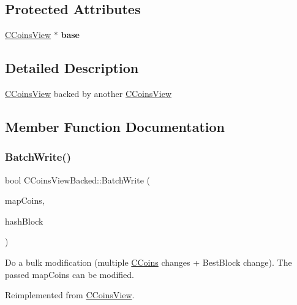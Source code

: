 \subsection*{Protected Attributes}
\begin{DoxyCompactItemize}
\item 
\mbox{\label{class_c_coins_view_backed_a901472317114adc4c104efd61dcf6203}} 
\mbox{\hyperlink{class_c_coins_view}{C\+Coins\+View}} $\ast$ {\bfseries base}
\end{DoxyCompactItemize}


\subsection{Detailed Description}
\mbox{\hyperlink{class_c_coins_view}{C\+Coins\+View}} backed by another \mbox{\hyperlink{class_c_coins_view}{C\+Coins\+View}} 

\subsection{Member Function Documentation}
\mbox{\label{class_c_coins_view_backed_ace15da3934c9d7a9cb9c7a787f92f764}} 
\subsubsection{\texorpdfstring{BatchWrite()}{BatchWrite()}}
{\footnotesize\ttfamily bool C\+Coins\+View\+Backed\+::\+Batch\+Write (\begin{DoxyParamCaption}\item[{C\+Coins\+Map \&}]{map\+Coins,  }\item[{const \mbox{\hyperlink{classuint256}{uint256}} \&}]{hash\+Block }\end{DoxyParamCaption})\hspace{0.3cm}{\ttfamily [virtual]}}

Do a bulk modification (multiple \mbox{\hyperlink{class_c_coins}{C\+Coins}} changes + Best\+Block change). The passed map\+Coins can be modified. 

Reimplemented from \mbox{\hyperlink{class_c_coins_view_ad7dc37396ca4fac7014cea06fec7178e}{C\+Coins\+View}}.



